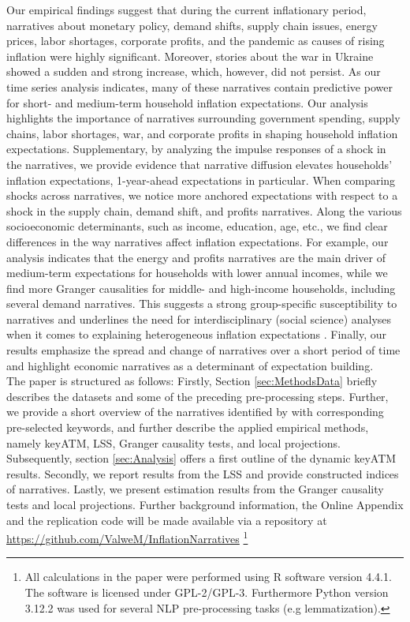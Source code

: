 Our empirical findings suggest that during the current inflationary period, narratives about monetary policy, demand shifts, supply chain issues, energy prices, labor shortages, corporate profits, and the pandemic as causes of rising inflation were highly significant. Moreover, stories about the war in Ukraine showed a sudden and strong increase, which, however, did not persist. As our time series analysis indicates, many of these narratives contain predictive power for short- and medium-term household inflation expectations. Our analysis highlights the importance of narratives surrounding government spending, supply chains, labor shortages, war, and corporate profits in shaping household inflation expectations. Supplementary, by analyzing the impulse responses of a shock in the narratives, we provide evidence that narrative diffusion elevates households' inflation expectations, 1-year-ahead expectations in particular. When comparing shocks across narratives, we notice more anchored expectations with respect to a shock in the supply chain, demand shift, and profits narratives. Along the various socioeconomic determinants, such as income, education, age, etc., we find clear differences in the way narratives affect inflation expectations. For example, our analysis indicates that the energy and profits narratives are the main driver of medium-term expectations for households with lower annual incomes, while we find more Granger causalities for middle- and high-income households, including several demand narratives. This suggests a strong group-specific susceptibility to narratives and underlines the need for interdisciplinary (social science) analyses when it comes to explaining heterogeneous inflation expectations \citep{Beckert.2016}. Finally, our results emphasize the spread and change of narratives over a short period of time and highlight economic narratives as a determinant of expectation building.\\

The paper is structured as follows: Firstly, Section \ref{sec:MethodsData} briefly describes the datasets and some of the preceding pre-processing steps. Further, we provide a short overview of the narratives identified by \cite{Andre.2023} with corresponding pre-selected keywords, and further describe the applied empirical methods, namely \textsf{keyATM}, \textsf{LSS}, Granger causality tests, and local projections. Subsequently, section \ref{sec:Analysis} offers a first outline of the dynamic \textsf{keyATM} results. Secondly, we report results from the \textsf{LSS} and provide constructed indices of narratives. Lastly, we present estimation results from the Granger causality tests and local projections. Further background information, the Online Appendix and the replication code will be made available via a repository at \url{https://github.com/ValweM/InflationNarratives} \footnote{All calculations in the paper were performed using R software \citep{R.2022} version 4.4.1. The software is licensed under GPL-2/GPL-3. Furthermore Python version 3.12.2 \citep{python.2009} was used for several NLP pre-processing tasks (e.g lemmatization).}
